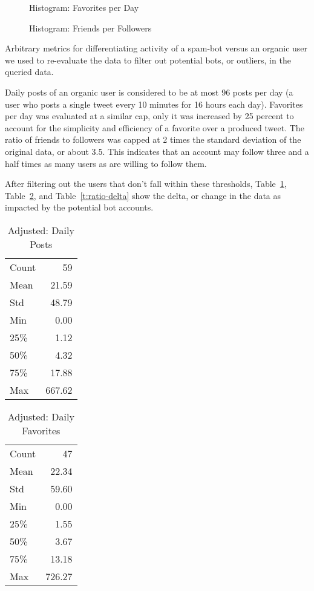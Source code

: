 \begin{figure}[!ht]
  \caption{Histogram: Favorites per Day}\label{f:faves-hist}
\end{figure}

\begin{figure}[!ht]
  \caption{Histogram: Friends per Followers}\label{f:ratio-hist}
\end{figure}

Arbitrary metrics for differentiating activity of a spam-bot versus an organic
user we used to re-evaluate the data to filter out potential bots, or outliers,
in the queried data.

Daily posts of an organic user is considered to be at most 96 posts per day (a
user who posts a single tweet every 10 minutes for 16 hours each day).
Favorites per day was evaluated at a similar cap, only it was increased by 25
percent to account for the simplicity and efficiency of a favorite over a
produced tweet.  The ratio of friends to followers was capped at 2 times the
standard deviation of the original data, or about 3.5. This indicates that an
account may follow three and a half times as many users as are willing to
follow them. 

After filtering out the users that don't fall within these thresholds,
Table~\ref{t:post-delta}, Table~\ref{t:faves-delta}, and
Table~\ref{t:ratio-delta} show the delta, or change in the data as impacted by
the potential bot accounts.

\begin{table}[htb]
\centering
\caption{Adjusted: Daily Posts}
\label{t:post-delta}
\begin{tabular}{lr}
Count & 59  \\
Mean  & 21.59  \\
Std   & 48.79  \\
Min   & 0.00   \\
25\%  & 1.12   \\
50\%  & 4.32   \\
75\%  & 17.88  \\
Max   & 667.62
\end{tabular}
\end{table}

\begin{table}[htb]
\centering
\caption{Adjusted: Daily Favorites}
\label{t:faves-delta}
\begin{tabular}{lr}
Count & 47  \\
Mean  & 22.34  \\
Std   & 59.60  \\
Min   & 0.00   \\
25\%  & 1.55   \\
50\%  & 3.67   \\
75\%  & 13.18  \\
Max   & 726.27
\end{tabular}
\end{table}

